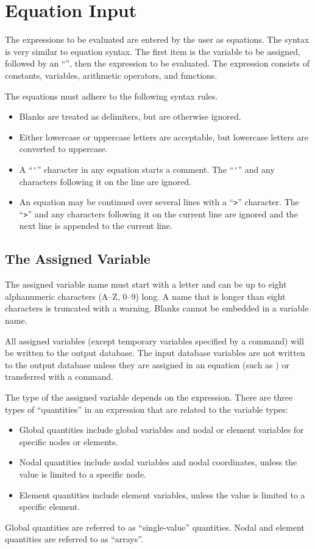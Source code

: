 \chapter{Equation Input} \label{chap:equation}

The expressions to be evaluated are entered by the user as equations.
The syntax is very similar to  equation syntax. The first
item is the variable to be assigned, followed by an ``\cmd{=}'', then
the expression to be evaluated. The expression consists of constants,
variables, arithmetic operators, and functions.

The equations must adhere to the following syntax rules.
\setlength{\itemsep}{\medskipamount} \begin{itemize}
\item
Blanks are treated as delimiters, but are otherwise ignored.
\item
Either lowercase or uppercase letters are acceptable, but lowercase
letters are converted to uppercase.
\item
A ``\verb|'|'' character in any equation starts a comment. The
``\verb|'|'' and any characters following it on the line are ignored.
\item
An equation may be continued over several lines with a ``\verb|>|''
character. The ``\verb|>|'' and any characters following it on the
current line are ignored and the next line is appended to the current
line.
\end{itemize}

\section{The Assigned Variable} \label{assvar}

The assigned variable name must start with a letter and can be up to
eight alphanumeric characters (A--Z, 0--9) long. A name that is longer
than eight characters is truncated with a warning. Blanks cannot be
embedded in a variable name.

All assigned variables (except temporary variables specified by a
 command) will be written to the output database. The input
database variables are not written to the output database unless they
are assigned in an equation (such as ) or transferred with a
 command.

The type of the assigned variable depends on the expression. There are
three types of ``quantities'' in an expression that are related to the
variable types:
\setlength{\itemsep}{\medskipamount} \begin{itemize}
\item
Global quantities include global variables and nodal or element
variables for specific nodes or elements.
\item
Nodal quantities include nodal variables and nodal coordinates, unless
the value is limited to a specific node.
\item
Element quantities include element variables, unless the value is
limited to a specific element.
\end{itemize}
Global quantities are referred to as ``single-value''
quantities. Nodal and element quantities are referred to as ``arrays''.

